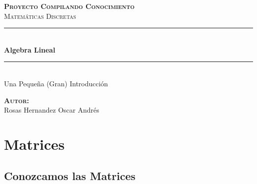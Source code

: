 \documentclass[12pt]{report}                                    %
\author{Oscar Andrés Rosas}                                     %
\begin{document}
\begin{titlepage}

	\center
	\textbf{\textsc{\Large Proyecto Compilando Conocimiento}}\\[1.0cm] 
	\textsc{\Large Matemáticas Discretas}\\[1.0cm] 

	\rule{\linewidth}{0.5mm} \\[1.0cm]
		{ \huge \bfseries Algebra Lineal}\\[1.0cm] 
	\rule{\linewidth}{0.5mm} \\[2.0cm]
	
	{\LARGE Una Pequeña (Gran) Introducción}\\[7cm] 
	
	\begin{center} \large
	\textbf{\textsc{Autor:}}\\
	Rosas Hernandez Oscar Andrés
	\end{center}

	\vfill

\end{titlepage}

\tableofcontents{}
\label{sec:Index}

\clearpage




\part{Matrices}
\clearpage


    \chapter{Conozcamos las Matrices}
\end{document}

